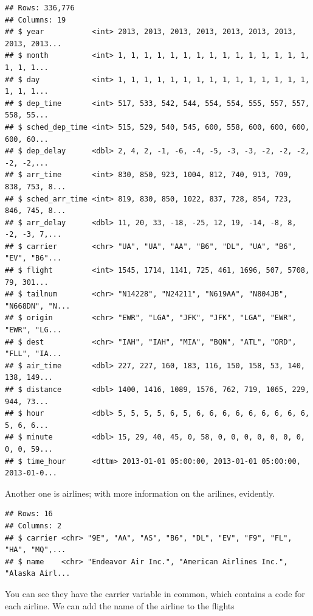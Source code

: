 \documentclass[]{tufte-book}
\newenvironment{Shaded}{}{}
\newcommand{\NormalTok}[1]{#1}
\newcommand{\OperatorTok}[1]{\textcolor[rgb]{0.40,0.40,0.40}{#1}}
\newcommand{\StringTok}[1]{\textcolor[rgb]{0.25,0.44,0.63}{#1}}
\begin{document}
\begin{verbatim}
## Rows: 336,776
## Columns: 19
## $ year           <int> 2013, 2013, 2013, 2013, 2013, 2013, 2013, 2013, 2013...
## $ month          <int> 1, 1, 1, 1, 1, 1, 1, 1, 1, 1, 1, 1, 1, 1, 1, 1, 1, 1...
## $ day            <int> 1, 1, 1, 1, 1, 1, 1, 1, 1, 1, 1, 1, 1, 1, 1, 1, 1, 1...
## $ dep_time       <int> 517, 533, 542, 544, 554, 554, 555, 557, 557, 558, 55...
## $ sched_dep_time <int> 515, 529, 540, 545, 600, 558, 600, 600, 600, 600, 60...
## $ dep_delay      <dbl> 2, 4, 2, -1, -6, -4, -5, -3, -3, -2, -2, -2, -2, -2,...
## $ arr_time       <int> 830, 850, 923, 1004, 812, 740, 913, 709, 838, 753, 8...
## $ sched_arr_time <int> 819, 830, 850, 1022, 837, 728, 854, 723, 846, 745, 8...
## $ arr_delay      <dbl> 11, 20, 33, -18, -25, 12, 19, -14, -8, 8, -2, -3, 7,...
## $ carrier        <chr> "UA", "UA", "AA", "B6", "DL", "UA", "B6", "EV", "B6"...
## $ flight         <int> 1545, 1714, 1141, 725, 461, 1696, 507, 5708, 79, 301...
## $ tailnum        <chr> "N14228", "N24211", "N619AA", "N804JB", "N668DN", "N...
## $ origin         <chr> "EWR", "LGA", "JFK", "JFK", "LGA", "EWR", "EWR", "LG...
## $ dest           <chr> "IAH", "IAH", "MIA", "BQN", "ATL", "ORD", "FLL", "IA...
## $ air_time       <dbl> 227, 227, 160, 183, 116, 150, 158, 53, 140, 138, 149...
## $ distance       <dbl> 1400, 1416, 1089, 1576, 762, 719, 1065, 229, 944, 73...
## $ hour           <dbl> 5, 5, 5, 5, 6, 5, 6, 6, 6, 6, 6, 6, 6, 6, 6, 5, 6, 6...
## $ minute         <dbl> 15, 29, 40, 45, 0, 58, 0, 0, 0, 0, 0, 0, 0, 0, 0, 59...
## $ time_hour      <dttm> 2013-01-01 05:00:00, 2013-01-01 05:00:00, 2013-01-0...
\end{verbatim}

Another one is airlines; with more information on the arilines, evidently.

\begin{Shaded}
\end{Shaded}

\begin{verbatim}
## Rows: 16
## Columns: 2
## $ carrier <chr> "9E", "AA", "AS", "B6", "DL", "EV", "F9", "FL", "HA", "MQ",...
## $ name    <chr> "Endeavor Air Inc.", "American Airlines Inc.", "Alaska Airl...
\end{verbatim}

You can see they have the carrier variable in common, which contains a code for each airline. We can add the name of the airline to the flights
\end{document}
